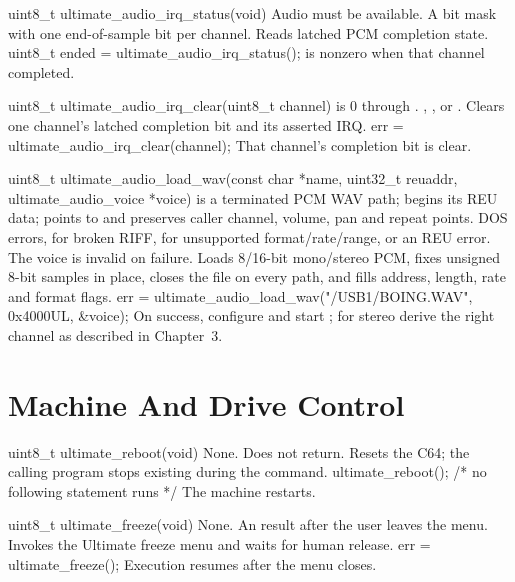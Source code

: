 \begin{referencechapter}
{uint8\_t ultimate\_audio\_irq\_status(void)}
{Audio must be available.}
{A bit mask with one end-of-sample bit per channel.}
{Reads latched PCM completion state.}
{uint8\_t ended = ultimate\_audio\_irq\_status();}
{ is nonzero when that channel completed.}

{uint8\_t ultimate\_audio\_irq\_clear(uint8\_t channel)}
{ is 0 through .}
{, , or
.}
{Clears one channel's latched completion bit and its asserted IRQ.}
{err = ultimate\_audio\_irq\_clear(channel);}
{That channel's completion bit is clear.}

{uint8\_t ultimate\_audio\_load\_wav(const char *name, uint32\_t reuaddr, ultimate\_audio\_voice *voice)}
{ is a terminated PCM WAV path;  begins its REU data;
 points to
\hyperref[struct:ultimate-audio-voice]{} and
preserves caller channel, volume, pan and repeat points.}
{DOS errors,  for broken RIFF,
 for unsupported format/rate/range, or an
REU error. The voice is invalid on failure.}
{Loads 8/16-bit mono/stereo PCM, fixes unsigned 8-bit samples in place, closes
the file on every path, and fills address, length, rate and format flags.}
{err = ultimate\_audio\_load\_wav("/USB1/BOING.WAV", 0x4000UL, \&voice);}
{On success, configure and start ; for stereo derive the right
channel as described in Chapter~3.}

\section{Machine And Drive Control}

{uint8\_t ultimate\_reboot(void)}
{None.}
{Does not return.}
{Resets the C64; the calling program stops existing during the command.}
{ultimate\_reboot(); /* no following statement runs */}
{The machine restarts.}

{uint8\_t ultimate\_freeze(void)}
{None.}
{An  result after the user leaves the menu.}
{Invokes the Ultimate freeze menu and waits for human release.}
{err = ultimate\_freeze();}
{Execution resumes after the menu closes.}


\end{referencechapter}
